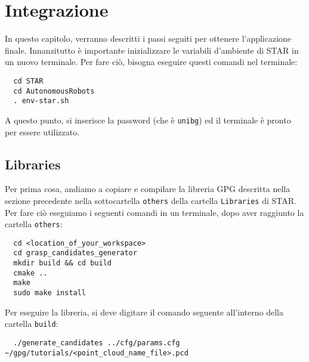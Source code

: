 \documentclass{report}
\begin{document}
\newpage
\chapter{Integrazione}\label{integrazione}
In questo capitolo, verranno descritti i passi seguiti per ottenere l'applicazione finale. Innanzitutto è importante inizializzare le variabili d'ambiente di STAR in un nuovo terminale. Per fare ciò, bisogna eseguire questi comandi nel terminale:
\begin{verbatim}
  cd STAR
  cd AutonomousRobots
  . env-star.sh
\end{verbatim}
A questo punto, si inserisce la password (che è \texttt{unibg}) ed il terminale è pronto per essere utilizzato. 
\section{Libraries}
Per prima cosa, andiamo a copiare e compilare la libreria GPG descritta nella sezione precedente nella sottocartella \texttt{others} della cartella \texttt{Libraries} di STAR. Per fare ciò eseguiamo i seguenti comandi in un terminale, dopo aver raggiunto la cartella \texttt{others}:
\begin{verbatim}
  cd <location_of_your_workspace>  
  cd grasp_candidates_generator
  mkdir build && cd build
  cmake ..
  make
  sudo make install
\end{verbatim}
Per eseguire la libreria, si deve digitare il comando seguente all'interno della cartella \texttt{build}:
\begin{verbatim}
  ./generate_candidates ../cfg/params.cfg ~/gpg/tutorials/<point_cloud_name_file>.pcd
\end{verbatim}
\end{document}
